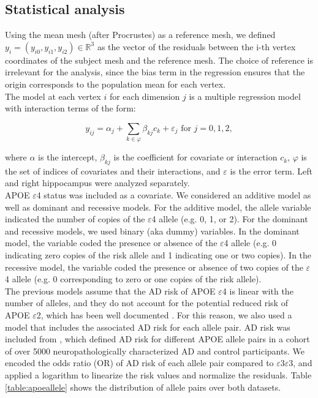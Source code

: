 \subsection{Statistical analysis}
\label{subsec:stat}

Using the mean mesh (after Procrustes) as a reference mesh, we defined $y_i=(y_{i0}, y_{i1}, y_{i2}) \in \mathbb{R}^3$ as the vector of the residuals between the i-th vertex coordinates of the subject mesh and the reference mesh. The choice of reference is irrelevant for the analysis, since the bias term in the regression ensures that the origin corresponds to the population mean for each vertex. \\

The model at each vertex $i$ for each dimension $j$ is a multiple regression model with interaction terms of the form:

\begin{equation}
    y_{ij} = \alpha_{j} + \sum_{k \in \mathcal{\varphi}} \beta_{kj} c_k + \varepsilon_j \textrm{ for } j = {0, 1, 2},
\end{equation} 

where $\alpha$ is the intercept, $\beta_{kj}$ is the coefficient for covariate or interaction $c_k$, $\mathcal{\varphi}$ is the set of indices of covariates and their interactions, and $\varepsilon$ is the error term. Left and right hippocampus were analyzed separately. \\ 

APOE $\varepsilon$4 status was included as a covariate. We considered an additive model as well as dominant and recessive models. For the additive model, the allele variable indicated the number of copies of the $\varepsilon$4 allele (e.g. 0, 1, or 2). For the dominant and recessive models, we used binary (aka dummy) variables. In the dominant model, the variable coded the presence or absence of the $\varepsilon$4 allele (e.g. 0 indicating zero copies of the risk allele and 1 indicating one or two copies). In the recessive model, the variable coded the presence or absence of two copies of the $\varepsilon$4 allele (e.g. 0 corresponding to zero or one copies of the risk allele). \\

The previous models assume that the AD risk of APOE $\varepsilon$4 is linear with the number of alleles, and they do not account for the potential reduced risk of APOE $\varepsilon$2, which has been well documented \cite{Genin2011,Liu2013a}. For this reason, we also used a model that includes the associated AD risk for each allele pair. AD risk was included from \cite{Reiman2020}, which defined AD risk for different APOE allele pairs in a cohort of over 5000 neuropathologically characterized AD and control participants. We encoded the odds ratio (OR) of AD risk of each allele pair compared to $\varepsilon$3$\varepsilon$3, and applied a logarithm to linearize the risk values and normalize the residuals. Table \ref{table:apoeallele} shows the distribution of allele pairs over both datasets. \\

